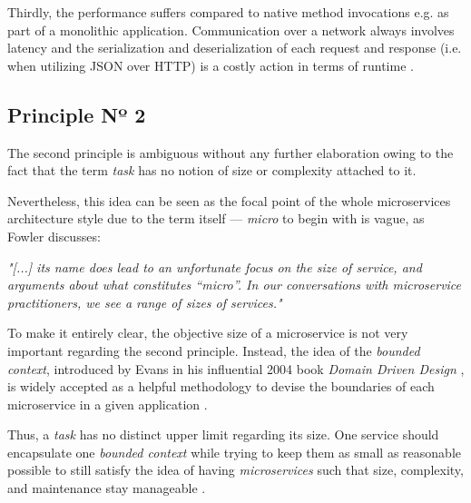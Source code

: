 \documentclass[12pt,a4paper]{report}
\begin{document}
Thirdly, the performance suffers compared to native method invocations e.g.
as part of a monolithic application. Communication over a network always
involves latency and the serialization and deserialization
of each request and response (i.e. when utilizing JSON over HTTP)
is a costly action in terms of runtime \cite{newman2015building}.


\subsection{Principle Nº 2} \label{subsect:ms-principle-2}
The second principle is ambiguous without any further elaboration owing to
the fact that the term \textit{task} has no notion of size or complexity
attached to it.

Nevertheless, this idea can be seen as the focal point of the whole microservices
architecture style due to the term itself --- \textit{micro} to begin with
is vague, as Fowler discusses:
\begin{displayquote}
\emph{"[...] its name does lead to an unfortunate focus on the size of service,
and arguments about what constitutes “micro”.
In our conversations with microservice practitioners,
we see a range of sizes of services."}~\cite{ms-fowler}
\end{displayquote}
To make it entirely clear, the objective size of a microservice is not very
important regarding the second principle. Instead, the idea of the
\textit{bounded context}, introduced by Evans in his influential 2004 book
\textit{Domain Driven Design} \cite{evans2004ddd}, is widely accepted as
a helpful methodology to devise the boundaries of each microservice
in a given application \cite{newman2015building, ms-fowler}.

Thus, a \textit{task} has no distinct upper limit regarding its size.
One service should encapsulate one \textit{bounded context} while trying to
keep them as small as reasonable possible to still satisfy the idea of having
\textit{microservices} such that size, complexity, and maintenance stay manageable
\cite{newman2015building, ms-fowler}.
\end{document}
